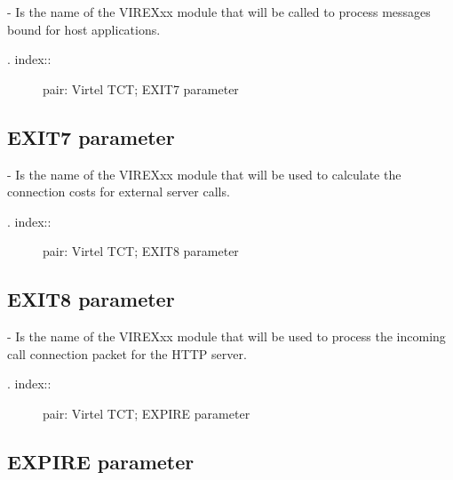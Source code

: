 \documentclass[letterpaper,10pt,english]{sphinxmanual}
\begin{document}
 - Is the name of the VIREXxx module that will be called to process messages bound for host applications.
\begin{description}
\item[{. index::}] \leavevmode
pair: Virtel TCT; EXIT7 parameter

\end{description}


\subsection{EXIT7 parameter}
\label{\detokenize{Installation_Guide:exit7-parameter}}
\begin{sphinxVerbatim}[commandchars=\\\{\}]
 
\end{sphinxVerbatim}

 - Is the name of the VIREXxx module that will be used to calculate the connection costs for external server calls.
\begin{description}
\item[{. index::}] \leavevmode
pair: Virtel TCT; EXIT8 parameter

\end{description}


\subsection{EXIT8 parameter}
\label{\detokenize{Installation_Guide:exit8-parameter}}
\begin{sphinxVerbatim}[commandchars=\\\{\}]
 
\end{sphinxVerbatim}

 - Is the name of the VIREXxx module that will be used to process the incoming call connection packet for the HTTP server.
\begin{description}
\item[{. index::}] \leavevmode
pair: Virtel TCT; EXPIRE parameter

\end{description}


\subsection{EXPIRE parameter}
\label{\detokenize{Installation_Guide:expire-parameter}}
\begin{sphinxVerbatim}[commandchars=\\\{\}]
 
\end{sphinxVerbatim}
\end{document}
